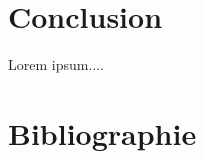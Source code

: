 \section*{Conclusion}

Lorem ipsum....

\newpage

\section*{Bibliographie}

\begin{thebibliography}{99}


\end{thebibliography}